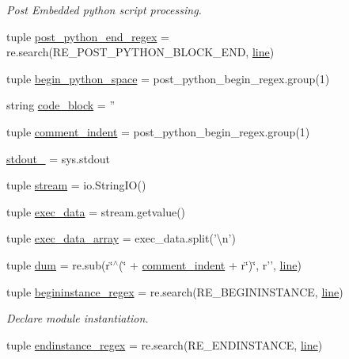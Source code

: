 \begin{DoxyCompactItemize}
\begin{DoxyCompactList}\small\item\em Post Embedded python script processing. \end{DoxyCompactList}\item 
tuple \hyperlink{namespaceveripy_a62ec90ed0de88469b45538484946a5b7}{post\-\_\-python\-\_\-end\-\_\-regex} = re.\-search(R\-E\-\_\-\-P\-O\-S\-T\-\_\-\-P\-Y\-T\-H\-O\-N\-\_\-\-B\-L\-O\-C\-K\-\_\-\-E\-N\-D, \hyperlink{namespaceveripy_a3cf9cf94513841f0d65d3081b08a55cc}{line})
\item 
tuple \hyperlink{namespaceveripy_ac27b8dbb034afa7793ce50076e0b68e3}{begin\-\_\-python\-\_\-space} = post\-\_\-python\-\_\-begin\-\_\-regex.\-group(1)
\item 
string \hyperlink{namespaceveripy_a08971c7a0053dfc5c58e4e443ce24122}{code\-\_\-block} = ''
\item 
tuple \hyperlink{namespaceveripy_a1767132c455069ae2f3d3eecfe441abd}{comment\-\_\-indent} = post\-\_\-python\-\_\-begin\-\_\-regex.\-group(1)
\item 
\hyperlink{namespaceveripy_a4fdf3a6b0a5f3ab656eb7e0bb38322de}{stdout\-\_\-} = sys.\-stdout
\item 
tuple \hyperlink{namespaceveripy_a5ab193beb474f15a242fa9d804d0ccb6}{stream} = io.\-String\-I\-O()
\item 
tuple \hyperlink{namespaceveripy_a3e3da32ab1aa18c45596c75506718d23}{exec\-\_\-data} = stream.\-getvalue()
\item 
tuple \hyperlink{namespaceveripy_ab6310f745bd0a9df4e151b1e5dede66f}{exec\-\_\-data\-\_\-array} = exec\-\_\-data.\-split('\textbackslash{}n')
\item 
tuple \hyperlink{namespaceveripy_a10641579d50981ec799455035259addc}{dum} = re.\-sub(r\char`\"{}$^\wedge$(\char`\"{} + \hyperlink{namespaceveripy_a1767132c455069ae2f3d3eecfe441abd}{comment\-\_\-indent} + r\char`\"{})\char`\"{}, r'', \hyperlink{namespaceveripy_a3cf9cf94513841f0d65d3081b08a55cc}{line})
\item 
tuple \hyperlink{namespaceveripy_ae4bac0ac3bb653fb2c6ccacc770d05f6}{begininstance\-\_\-regex} = re.\-search(R\-E\-\_\-\-B\-E\-G\-I\-N\-I\-N\-S\-T\-A\-N\-C\-E, \hyperlink{namespaceveripy_a3cf9cf94513841f0d65d3081b08a55cc}{line})
\begin{DoxyCompactList}\small\item\em Declare module instantiation. \end{DoxyCompactList}\item 
tuple \hyperlink{namespaceveripy_ace16773ac50b8685d48f7b5c063e3c18}{endinstance\-\_\-regex} = re.\-search(R\-E\-\_\-\-E\-N\-D\-I\-N\-S\-T\-A\-N\-C\-E, \hyperlink{namespaceveripy_a3cf9cf94513841f0d65d3081b08a55cc}{line})

\end{DoxyCompactItemize}
